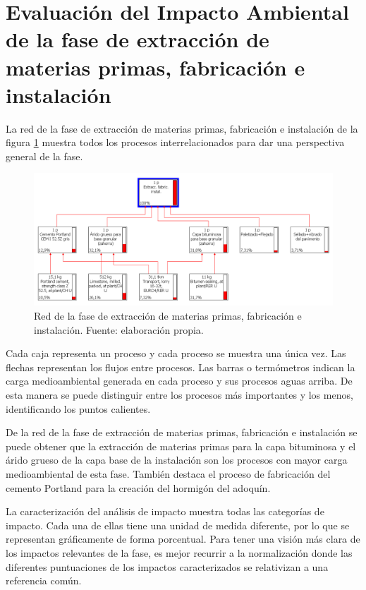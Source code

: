 \section{Evaluación del Impacto Ambiental de la fase de extracción de materias primas, fabricación e instalación}

La red de la fase de extracción de materias primas, fabricación e instalación de la figura \ref{fig:fabric_red} muestra todos los procesos interrelacionados para dar una perspectiva general de la fase.

\begin{figure}[!htb]
\centering
\includegraphics[width=14cm]{img/fabric_red.png}
\caption[Red de la fase de extracción de materias primas, fabricación e instalación.]{Red de la fase de extracción de materias primas, fabricación e instalación. Fuente: elaboración propia.}
\label{fig:fabric_red}
\end{figure}

Cada caja representa un proceso y cada proceso se muestra una única vez. Las flechas representan los flujos entre procesos. Las barras o termómetros indican la carga medioambiental generada en cada proceso y sus procesos aguas arriba. De esta manera se puede distinguir entre los procesos más importantes y los menos, identificando los puntos calientes.

De la red de la fase de extracción de materias primas, fabricación e instalación se puede obtener que la extracción de materias primas para la capa bituminosa y el árido grueso de la capa base de la instalación son los procesos con mayor carga medioambiental de esta fase. También destaca el proceso de fabricación del cemento Portland para la creación del hormigón del adoquín.

La caracterización del análisis de impacto muestra todas las categorías de impacto. Cada una de ellas tiene una unidad de medida diferente, por lo que se representan gráficamente de forma porcentual. Para tener una visión más clara de los impactos relevantes de la fase, es mejor recurrir a la normalización donde las diferentes puntuaciones de los impactos caracterizados se relativizan a una referencia común.

